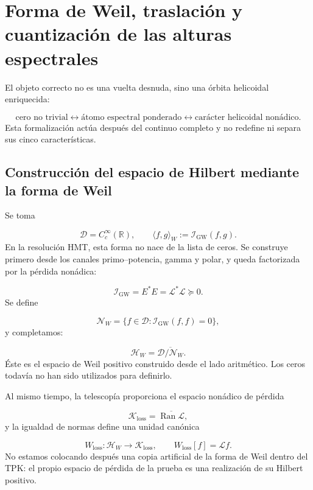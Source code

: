 \section{Forma de Weil, traslación y cuantización de las alturas espectrales}
El objeto correcto no es una vuelta desnuda, sino una órbita helicoidal enriquecida:\par
\[
\boxed{
\text{cero no trivial}
\longleftrightarrow
\text{átomo espectral ponderado}
\longleftrightarrow
\text{carácter helicoidal nonádico}.
}
\]
Esta formalización actúa después del continuo completo y no redefine ni separa sus cinco características.\par
{}
\subsection{Construcción del espacio de Hilbert mediante la forma de Weil}
Se toma\par
\[
\mathcal D=C_c^\infty(\mathbb R),
\qquad
\langle f,g\rangle_W
:=
\mathscr I_{\mathrm{GW}}(f,g).
\]
En la resolución HMT, esta forma no nace de la lista de ceros. Se construye primero desde los canales primo–potencia, gamma y polar, y queda factorizada por la pérdida nonádica:\par
\[
\mathscr I_{\mathrm{GW}}
=
E^*E
=
\mathscr L^*\mathscr L
\succeq0.
\]
Se define\par
\[
\mathcal N_W
=
\{f\in\mathcal D:
\mathscr I_{\mathrm{GW}}(f,f)=0\},
\]
y completamos:\par
\[
\mathcal H_W
=
\overline{\mathcal D/\mathcal N_W}.
\]
Éste es el espacio de Weil positivo construido desde el lado aritmético. Los ceros todavía no han sido utilizados para definirlo.\par
Al mismo tiempo, la telescopía proporciona el espacio nonádico de pérdida\par
\[
\mathcal K_{\mathrm{loss}}
=
\overline{\operatorname{Ran}\mathscr L},
\]
y la igualdad de normas define una unidad canónica\par
\[
W_{\mathrm{loss}}:
\mathcal H_W
\longrightarrow
\mathcal K_{\mathrm{loss}},
\qquad
W_{\mathrm{loss}}[f]=\mathscr Lf.
\]
No estamos colocando después una copia artificial de la forma de Weil dentro del TPK: el propio espacio de pérdida de la prueba es una realización de su Hilbert positivo.\par
{}
